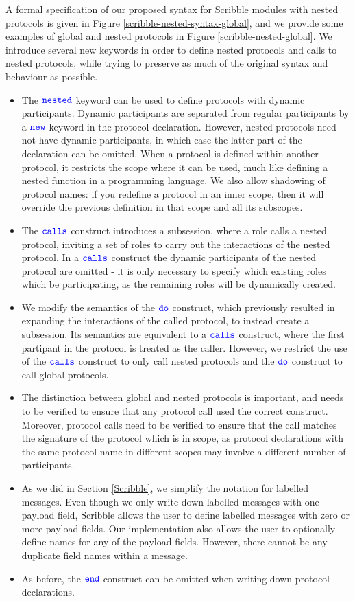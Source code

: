 \documentclass[12pt,twoside]{report}
\begin{document}
A formal specification of our proposed syntax for Scribble modules with nested protocols is given in Figure \ref{scribble-nested-syntax-global}, and we provide some examples of global and nested protocols in Figure \ref{scribble-nested-global}. We introduce several new keywords in order to define nested protocols and calls to nested protocols, while trying to preserve as much of the original syntax and behaviour as possible.
\begin{itemize}
    \item The ${\color{blue}\mathtt{nested}}$ keyword can be used to define protocols with dynamic participants. Dynamic participants are separated from regular participants by a ${\color{blue}\mathtt{new}}$ keyword in the protocol declaration. However, nested protocols need not have dynamic participants, in which case the latter part of the declaration can be omitted. When a protocol is defined within another protocol, it restricts the scope where it can be used, much like defining a nested function in a programming language. We also allow shadowing of protocol names: if you redefine a protocol in an inner scope, then it will override the previous definition in that scope and all its subscopes.
    \item The ${\color{blue}\mathtt{calls}}$ construct introduces a subsession, where a role calls a nested protocol, inviting a set of roles to carry out the interactions of the nested protocol. In a ${\color{blue}\mathtt{calls}}$ construct the dynamic participants of the nested protocol are omitted - it is only necessary to specify which existing roles which be participating, as the remaining roles will be dynamically created.
    \item We modify the semantics of the ${\color{blue}\mathtt{do}}$ construct, which previously resulted in expanding the interactions of the called protocol, to instead create a subsession. Its semantics are equivalent to a ${\color{blue}\mathtt{calls}}$ construct, where the first partipant in the protocol is treated as the caller. However, we restrict the use of the ${\color{blue}\mathtt{calls}}$ construct to only call nested protocols and the ${\color{blue}\mathtt{do}}$ construct to call global protocols. 
    \item The distinction between global and nested protocols is important, and needs to be verified to ensure that any protocol call used the correct construct. Moreover, protocol calls need to be verified to ensure that the call matches the signature of the protocol which is in scope, as protocol declarations with the same protocol name in different scopes may involve a different number of participants.
    \item As we did in Section \ref{Scribble}, we simplify the notation for labelled messages. Even though we only write down labelled messages with one payload field, Scribble allows the user to define labelled messages with zero or more payload fields. Our implementation also allows the user to optionally define names for any of the payload fields. However, there cannot be any duplicate field names within a message.
    \item As before, the ${\color{blue}\mathtt{end}}$ construct can be omitted when writing down protocol declarations.
\end{itemize}
\end{document}
